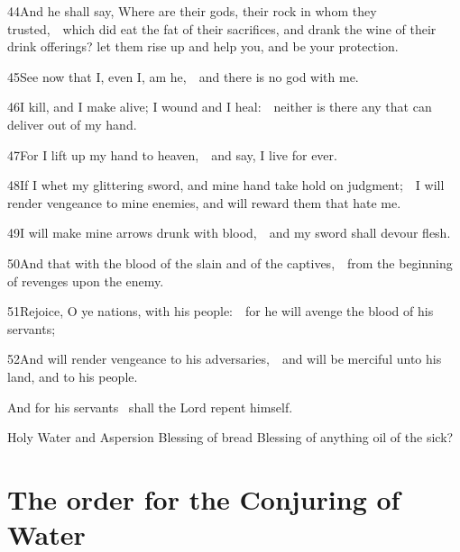 44\enspace And he shall say, Where are their gods, their rock in whom they trusted,\ \star\ which did eat the fat of their sacrifices, and drank the wine of their drink offerings? let them rise up and help you, and be your protection.

45\enspace See now that I, even I, am he,\ \star\ and there is no god with me.

46\enspace I kill, and I make alive; I wound and I heal:\ \star\ neither is there any that can deliver out of my hand.

47\enspace For I lift up my hand to heaven,\ \star\ and say, I live for ever.

48\enspace If I whet my glittering sword, and mine hand take hold on judgment;\ \star\ I will render vengeance to mine enemies, and will reward them that hate me.

49\enspace I will make mine arrows drunk with blood,\ \star\ and my sword shall devour flesh.

50\enspace And that with the blood of the slain and of the captives,\ \star\ from the beginning of revenges upon the enemy.

51\enspace Rejoice, O ye nations, with his people:\ \star\ for he will avenge the blood of his servants;

52\enspace And will render vengeance to his adversaries,\ \star\ and will be merciful unto his land, and to his people.

 And for his servants \star\ shall the Lord repent himself.

Holy Water and Aspersion
Blessing of bread
Blessing of anything
oil of the sick?



\section{The order for the Conjuring of Water}

\smallskip
{}



